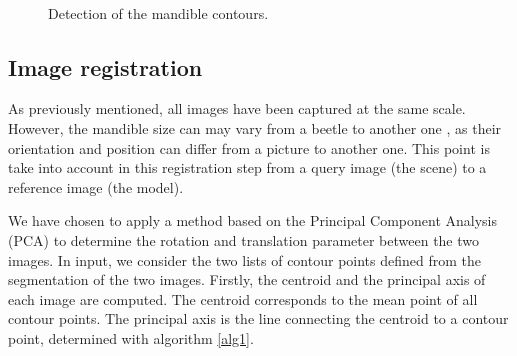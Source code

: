 \documentclass[twoside,twocolumn,10pt]{article}
\begin{document}
\begin{figure}[htbp]
\centering
{}~~
\caption{Detection of the mandible contours.}
\label{canny}
\end{figure}


\subsection{Image registration}
\label{sec:registration}

As previously mentioned, all images have been captured at the same scale.
However, the mandible size can may vary from a beetle to another one , as their orientation and position can differ from a picture to another one.
This point is take into account in this registration step from a query image (the scene) to a reference image (the model).

We have chosen to apply a method based on the Principal Component Analysis (PCA) \cite{bsspca,shlens2014tutorial} to determine the rotation and translation parameter between the two images.
In input, we consider the two lists of contour points defined from the segmentation of the two images.
Firstly, the centroid and the principal axis of each image are computed.
The centroid corresponds to the mean point of all contour points.
The principal axis is the line connecting the centroid to a contour point, determined with algorithm \ref{alg1}.
\end{document}
